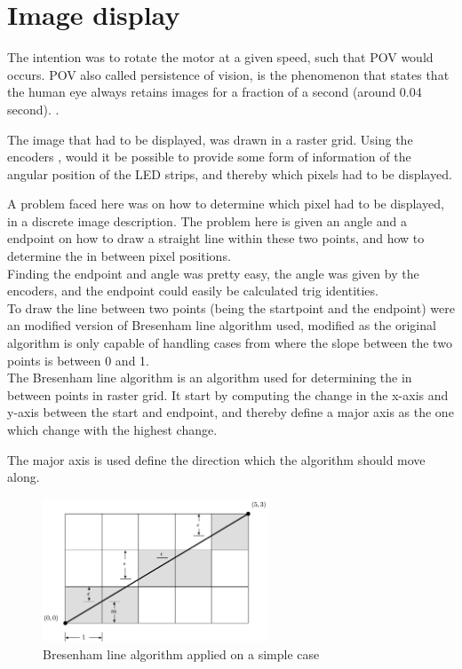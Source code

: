 \documentclass[10pt,a4paper]{article}
\begin{document}
\section{Image display}
The intention was to rotate the motor at a given speed, such that POV would occurs. POV also called persistence of vision, is the phenomenon that states that the human eye  
always retains images for a fraction of a second (around 0.04 second). . 

The image that had to be displayed, was drawn in a raster grid. Using the encoders , would it be  possible to provide some form of information of the angular position of the LED strips, and thereby which pixels had to be displayed. 


A problem faced here was on how to determine which pixel had to be displayed, in a discrete image description. The problem here is given an angle and a endpoint on how to draw a straight line within these two points, and how to determine the in between pixel positions. \\
Finding the endpoint and angle was pretty easy, the angle was given by the encoders, and the endpoint could easily be calculated trig identities. \\

To draw the line between two points (being the startpoint and the endpoint) were an modified version of Bresenham line algorithm used,  modified as the original algorithm is only capable of handling cases from where the slope between the two points is between 0 and 1. \\

The Bresenham line algorithm is an algorithm used for determining the in between points in raster grid.  It start by computing the change in the x-axis and y-axis  between the start and endpoint, and thereby define a major axis as the one which change with the highest change. 


The major axis is used define the direction which the algorithm should move along. 

\begin{figure}[H]
\center
\includegraphics[width = 0.6\textwidth]{bresenhamline}
\caption{Bresenham line algorithm applied on a simple case}
\label{fig:bresenham_line}
\end{figure}
\end{document}
